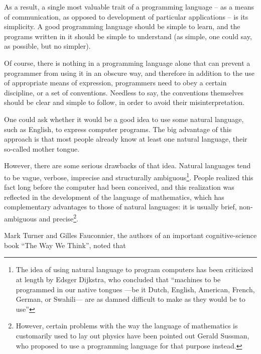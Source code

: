 As a result, a single most valuable trait of a programming language
-- as a means of communication, as opposed to development of particular
applications -- is its simplicity. A good programming language should
be simple to learn, and the programs written in it should be simple
to understand (as simple, one could say, as possible, but no simpler).

Of course, there is nothing in a programming language alone that
can prevent a programmer from using it in an obscure way, and therefore
in addition to the use of appropriate means of expression, programmers
need to obey a certain discipline, or a set of conventions. Needless
to say, the conventions themselves should be clear and simple to follow,
in order to avoid their misinterpretation.

One could ask whether it would be a good idea to use some natural language,
such as English, to express computer programs. The big advantage of this
approach is that most people already know at least one natural language,
their so-called mother tongue.

However, there are some serious drawbacks of that idea. Natural languages
tend to be vague, verbose, imprecise and structurally ambiguous\footnote{
  The idea of using natural language to program computers has been criticized
  at length by Edsger Dijkstra, who concluded that ``machines to be programmed
  in our native tongues —be it Dutch, English, American, French, German,
  or Swahili— are as damned difficult to make as they would be to
  use''\cite{Dijkstra1997}}.
People realized this fact long before the computer had been conceived, and this
realization was reflected in the development of the language of mathematics,
which has complementary advantages to those of natural languages: it is
usually brief, non-ambiguous and precise\footnote{However, certain problems
  with the way the language of mathematics is customarily used to lay out
  physics have been pointed out Gerald Sussman, who proposed to use a programming
  language for that purpose instead\cite{SICM}.}.

Mark Turner and Gilles Fauconnier, the authors of an important cognitive-science
book ``The Way We Think'', noted that

